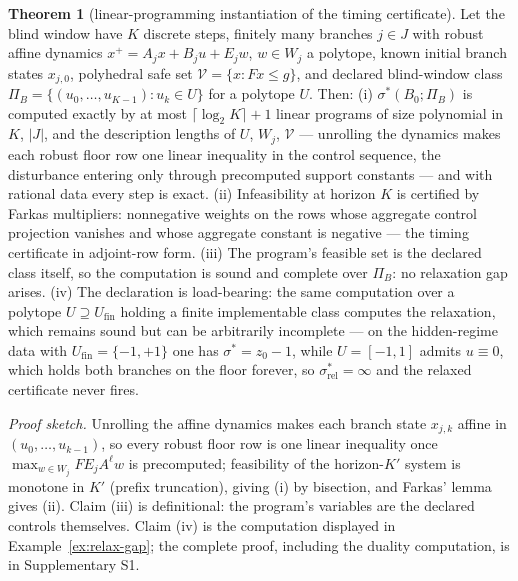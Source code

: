 \documentclass[10pt,twocolumn]{article}
\theoremstyle{definition}
\newtheorem{theorem}{Theorem}
\begin{document}
\begin{theorem}[linear-programming instantiation of the timing certificate]\label{thm:lp-instant}
Let the blind window have \(K\) discrete steps, finitely many branches \(j \in J\) with
robust affine dynamics \(x^{+} = A_{j} x + B_{j} u + E_{j} w\), \(w \in W_{j}\) a polytope,
known initial branch states \(x_{j,0}\), polyhedral safe set \(\mathcal{V} = \{x : Fx \le g\}\),
and declared blind-window class \(\Pi_{B} = \{(u_{0},\dots,u_{K-1}) : u_{k} \in U\}\) for a
polytope \(U\). Then: (i) \(\sigma^{*}(B_{0}; \Pi_{B})\) is computed exactly by at most
\(\lceil \log_{2} K \rceil + 1\) linear programs of size polynomial in \(K\), \(|J|\), and the
description lengths of \(U\), \(W_{j}\), \(\mathcal{V}\) --- unrolling the dynamics makes each
robust floor row one linear inequality in the control sequence, the disturbance entering only
through precomputed support constants --- and with rational data every step is exact.
(ii) Infeasibility at horizon \(K\) is certified by Farkas multipliers: nonnegative weights on
the rows whose aggregate control projection vanishes and whose aggregate constant is negative
--- the timing certificate in adjoint-row form. (iii) The program's feasible set is the
declared class itself, so the computation is sound and complete over \(\Pi_{B}\): no relaxation
gap arises. (iv) The declaration is load-bearing: the same computation over a polytope
\(U \supseteq U_{\mathrm{fin}}\) holding a finite implementable class computes the relaxation,
which remains sound but can be arbitrarily incomplete --- on the hidden-regime data with
\(U_{\mathrm{fin}} = \{-1, +1\}\) one has \(\sigma^{*} = z_{0} - 1\), while \(U = [-1,1]\)
admits \(u \equiv 0\), which holds both branches on the floor forever, so
\(\sigma^{*}_{\mathrm{rel}} = \infty\) and the relaxed certificate never fires.
\end{theorem}

\emph{Proof sketch.} Unrolling the affine dynamics makes each branch state
\(x_{j,k}\) affine in \((u_{0},\dots,u_{k-1})\), so every robust floor row is one linear
inequality once \(\max_{w \in W_{j}} F E_{j} A^{\ell} w\) is precomputed; feasibility of the
horizon-\(K'\) system is monotone in \(K'\) (prefix truncation), giving (i) by bisection, and
Farkas' lemma gives (ii). Claim (iii) is definitional: the program's variables are the declared
controls themselves. Claim (iv) is the computation displayed in
Example~\ref{ex:relax-gap}; the complete proof, including the duality computation, is in
Supplementary S1.
\end{document}
